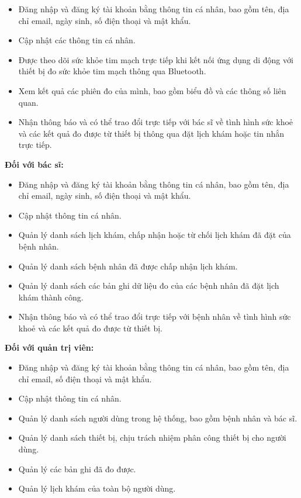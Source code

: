 \begin{adjustwidth}{1.5em}{}
	\begin{itemize}
		\item Đăng nhập và đăng ký tài khoản bằng thông tin cá nhân, bao gồm tên, địa chỉ email, ngày sinh, số điện thoại và mật khẩu.
		\item Cập nhật các thông tin cá nhân.
		\item Được theo dõi sức khỏe tim mạch trực tiếp khi kết nối ứng dụng di động với thiết bị đo sức khỏe tim mạch thông qua Bluetooth.
		\item Xem kết quả các phiên đo của mình, bao gồm biểu đồ và các thông số liên quan.
		\item Nhận thông báo và có thể trao đổi trực tiếp với bác sĩ về tình hình sức khoẻ và các kết quả đo được từ thiết bị thông qua đặt lịch khám hoặc tin nhắn trực tiếp.
	\end{itemize}
\end{adjustwidth}
\textbf{Đối với bác sĩ:}
\begin{adjustwidth}{1.5em}{}
	\begin{itemize}
		\item Đăng nhập và đăng ký tài khoản bằng thông tin cá nhân, bao gồm tên, địa chỉ email, ngày sinh, số điện thoại và mật khẩu.
		\item Cập nhật thông tin cá nhân.
		\item Quản lý danh sách lịch khám, chấp nhận hoặc từ chối lịch khám đã đặt của bệnh nhân.
		\item Quản lý danh sách bệnh nhân đã được chấp nhận lịch khám.
		\item Quản lý danh sách các bản ghi dữ liệu đo của các bệnh nhân đã đặt lịch khám thành công.
		\item Nhận thông báo và có thể trao đổi trực tiếp với bệnh nhân về tình hình sức khoẻ và các kết quả đo được từ thiết bị.
	\end{itemize}
\end{adjustwidth}
\textbf{Đối với quản trị viên:}
\begin{adjustwidth}{1.5em}{}
	\begin{itemize}
		\item Đăng nhập và đăng ký tài khoản bằng thông tin cá nhân, bao gồm tên, địa chỉ email, số điện thoại và mật khẩu.
		\item Cập nhật thông tin cá nhân.
		\item Quản lý danh sách người dùng trong hệ thống, bao gồm bệnh nhân và bác sĩ.
		\item Quản lý danh sách thiết bị, chịu trách nhiệm phân công thiết bị cho người dùng.
		\item Quản lý các bản ghi đã đo được.
		\item Quản lý lịch khám của toàn bộ người dùng.
	\end{itemize}
\end{adjustwidth}

